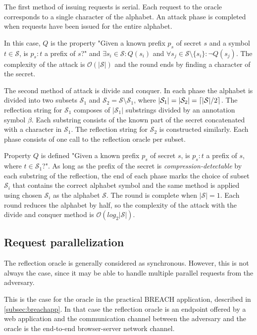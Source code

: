 \documentclass[conference, letterpaper, 10pt]{IEEEtran}
\DeclarePairedDelimiter{\ceil}{\lceil}{\rceil}
\begin{document}
The first method of issuing requests is serial. Each request to the oracle
corresponds to a single character of the alphabet. An attack phase is completed
when requests have been issued for the entire alphabet.

In this case, $Q$ is the property "Given a known prefix $p_s$ of secret $s$ and
a symbol $t \in \mathcal{S}$, is $p_s:t$ a prefix of $s$?" and $\exists
s_i \in \mathcal{S}: Q(s_i)$ and $\forall s_j \in \mathcal{S} \setminus \{s_i\}:
\lnot Q(s_j)$. The complexity of the attack is $\mathcal{O}(|\mathcal{S}|)$ and
the round ends by finding a character of the secret.

The second method of attack is divide and conquer. In each phase the alphabet is
divided into two subsets $\mathcal{S}_1$ and $\mathcal{S}_2 = \mathcal{S}
\setminus \mathcal{S}_1$, where $|\mathcal{S}_1| = |\mathcal{S}_2| =
\ceil{|\mathcal{S}| / 2}$. The reflection string for $\mathcal{S}_1$ composes of
$|\mathcal{S}_1|$ substrings divided by an annotation symbol $\beta$. Each
substring consists of the known part of the secret concatenated with a character
in $\mathcal{S}_1$. The reflection string for $\mathcal{S}_2$ is constructed
similarly. Each phase consists of one call to the reflection oracle per subset.

Property $Q$ is defined "Given a known prefix $p_s$ of secret $s$, is $p_s:t$ a
prefix of $s$, where $t \in \mathcal{S}_1$?". As long as the prefix of the
secret is \textit{compression-detectable} by each substring of the reflection,
the end of each phase marks the choice of subset $\mathcal{S}_i$ that contains
the correct alphabet symbol and the same method is applied using chosen
$\mathcal{S}_i$ as the alphabet $\mathcal{S}$. The round is complete when
$|\mathcal{S}| = 1$. Each round reduces the alphabet by half, so the complexity
of the attack with the divide and conquer method  is
$\mathcal{O}(log_2|\mathcal{S}|)$.

\subsection{Request parallelization}\label{subsec:parallel}
The reflection oracle is generally considered as synchronous. However, this is not
always the case, since it may be able to handle multiple parallel requests from
the adversary.

This is the case for the oracle in the practical BREACH application, described
in \ref{subsec:breachapp}. In that case the reflection oracle is an endpoint
offered by a web application and the communication channel between the adversary
and the oracle is the end-to-end browser-server network channel.
\end{document}
